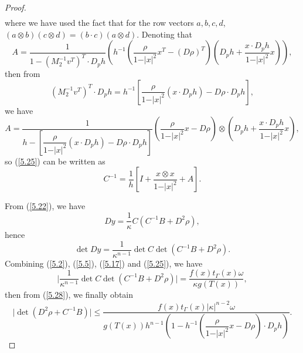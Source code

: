 \documentclass[a4paper,12pt,]{article}
\numberwithin{equation}{section}
\numberwithin{equation}{section} \allowdisplaybreaks
\begin{document}
\begin{proof}
\begin{align*}
  \end{align*}
  where we have used the fact that for the row vectors $a,b,c,d$, $(a \otimes b)(c \otimes d) = (b \cdot c)(a \otimes d)$. Denoting that
  \begin{equation*}
    A = \frac{1}{1 - (M_{2}^{-1}v^{T})^{T}\cdot D_{p}h}\left(h^{-1}\left(\frac{\rho}{1 - \vert x \vert^{2}}x^{T} - (D\rho)^{T}\right)\left(D_{p}h + \frac{x \cdot D_{p}h}{1 - \vert x \vert^{2}}x\right)\right),
  \end{equation*}
  then from
  \begin{equation*}
    (M_{2}^{-1}v^{T})^{T}\cdot D_{p}h = h^{-1}\left[\frac{\rho}{1 - \vert x \vert^{2}}(x \cdot D_{p}h) - D\rho \cdot D_{p}h\right],
  \end{equation*}
  we have
  \begin{equation*}
    A = \frac{1}{h - \left[\dfrac{\rho}{1 - \vert x \vert^{2}}(x \cdot D_{p}h) - D\rho \cdot D_{p}h\right]}\left(\frac{\rho}{1 - \vert x \vert^{2}}x - D\rho\right)\otimes \left(D_{p}h + \frac{x \cdot D_{p}h}{1 - \vert x \vert^{2}}x\right),
  \end{equation*}
  so (\ref{5.25}) can be written as
  \begin{equation*}
    C^{-1} = \frac{1}{h}\left[I + \frac{x \otimes x}{1 - \vert x \vert^{2}} + A\right].
  \end{equation*}

  From (\ref{5.22}), we have
  \begin{equation*}
    Dy = \frac{1}{\kappa}C(C^{-1}B + D^{2}\rho),
  \end{equation*}
  hence
  \begin{equation}\label{5.29}
    \det Dy = \frac{1}{\kappa^{n-1}} \det C \det (C^{-1}B + D^{2}\rho).
  \end{equation}
  Combining (\ref{5.2}), (\ref{5.5}), (\ref{5.17}) and (\ref{5.25}), we have
  \begin{equation*}
    \vert \frac{1}{\kappa^{n-1}} \det C \det (C^{-1}B + D^{2}\rho) \vert = \frac{f(x)t_{\Gamma}(x)\omega}{\kappa g(T(x))},
  \end{equation*}
  then from (\ref{5.28}), we finally obtain
  \begin{equation*}
    \vert \det (D^{2}\rho + C^{-1}B) \vert \leq \frac{f(x)t_{\Gamma}(x)\vert \kappa \vert^{n - 2} \omega}{g(T(x))h^{n - 1}\left(1 - h^{-1}\left(\dfrac{\rho}{1 - \vert x \vert^{2}}x - D\rho\right)\cdot D_{p}h\right)}.
  \end{equation*}

\end{proof}
\end{document}
